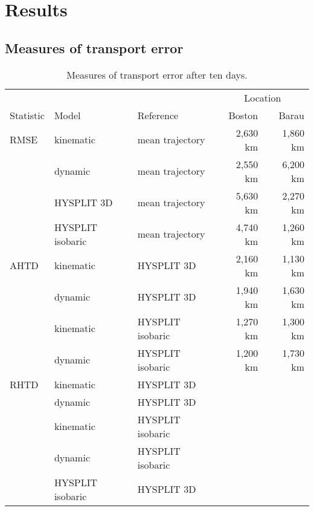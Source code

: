 \chapter{Results}

\section{Measures of transport error}

\begin{table}
    \centering
    \caption{Measures of transport error after ten days.}    
    \begin{tabular}{ l l l r r }
        \hline
        \hline
        			&				&				& 	\multicolumn{2}{c}{Location} \\
	\cline{4-5}
        Statistic 	& Model 			& Reference 		& Boston 		& Barau		\\
        \hline
        RMSE	& kinematic 		& mean trajectory	& 2,630 km	& 1,860 km	\\
        		 	& dynamic 		& mean trajectory	& 2,550 km	& 6,200 km	\\
			& HYSPLIT 3D 		& mean trajectory	& 5,630 km	& 2,270 km	\\
        		 	& HYSPLIT isobaric 	& mean trajectory	& 4,740 km	& 1,260 km	\\
        AHTD 	& kinematic		& HYSPLIT 3D		& 2,160 km	& 1,130 km	\\
        		 	& dynamic			& HYSPLIT 3D 		& 1,940 km	& 1,630 km	\\
        		 	& kinematic		& HYSPLIT isobaric  & 1,270 km	& 1,300 km	\\
        		 	& dynamic			& HYSPLIT isobaric  & 1,200 km	& 1,730 km	\\
        RHTD 	& kinematic		& HYSPLIT 3D		&			&			\\
        		 	& dynamic			& HYSPLIT 3D 		&			&			\\
        		 	& kinematic		& HYSPLIT isobaric  &			&			\\
        		 	& dynamic			& HYSPLIT isobaric  &			&			\\
			& HYSPLIT isobaric	& HYSPLIT 3D 		&			&			\\	
        \hline
    \end{tabular}
\end{table}